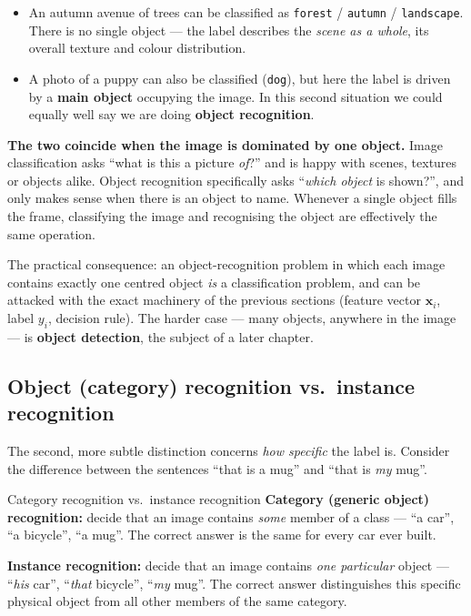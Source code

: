 \documentclass{report}
\newcommand{\xvec}{\mathbf{x}}
\begin{document}
\begin{itemize}
\item An autumn avenue of trees can be classified as \texttt{forest} /
\texttt{autumn} / \texttt{landscape}. There is no single object --- the label
describes the \emph{scene as a whole}, its overall texture and colour
distribution.
\item A photo of a puppy can also be classified (\texttt{dog}), but here the
label is driven by a \textbf{main object} occupying the image. In this second
situation we could equally well say we are doing \textbf{object recognition}.
\end{itemize}

\begin{keybox}
\textbf{The two coincide when the image is dominated by one object.}
Image classification asks ``what is this a picture \emph{of}?'' and is happy
with scenes, textures or objects alike. Object recognition specifically asks
``\emph{which object} is shown?'', and only makes sense when there is an object
to name. Whenever a single object fills the frame, classifying the image and
recognising the object are effectively the same operation.
\end{keybox}

The practical consequence: an object-recognition problem in which each image
contains exactly one centred object \emph{is} a classification problem, and can
be attacked with the exact machinery of the previous sections (feature vector $\xvec_i$,
label $y_i$, decision rule). The harder case --- many objects, anywhere in the
image --- is \textbf{object detection}, the subject of a later chapter.

\subsection{Object (category) recognition vs.\ instance recognition}

The second, more subtle distinction concerns \emph{how specific} the label is.
Consider the difference between the sentences ``that is a mug'' and ``that is
\emph{my} mug''.

\begin{defbox}{Category recognition vs.\ instance recognition}
\textbf{Category (generic object) recognition:} decide that an image contains
\emph{some} member of a class --- ``a car'', ``a bicycle'', ``a mug''. The
correct answer is the same for every car ever built.

\medskip
\textbf{Instance recognition:} decide that an image contains \emph{one
particular} object --- ``\emph{his} car'', ``\emph{that} bicycle'', ``\emph{my}
mug''. The correct answer distinguishes this specific physical object from all
other members of the same category.
\end{defbox}
\end{document}
